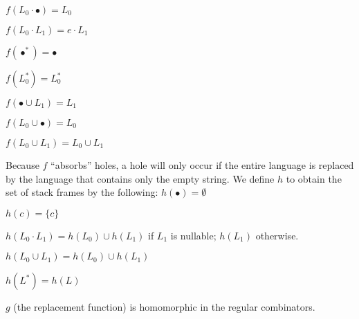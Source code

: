 \documentclass{sigplanconf}
\begin{document}
$f(L_0\cdot\bullet)=L_0$

$f(L_0\cdot L_1)=e\cdot L_1$

$f(\bullet^*)=\bullet$

$f(L_0^*)=L_0^*$

$f(\bullet\cup L_1)=L_1$

$f(L_0\cup\bullet)=L_0$

$f(L_0\cup L_1)=L_0\cup L_1$

Because $f$ ``absorbs'' holes, a hole will only occur if the entire language is replaced by the language that contains only the empty string.
We define $h$ to obtain the set of stack frames by the following:
$h(\bullet)=\emptyset$

$h(c)=\{c\}$

$h(L_0\cdot L_1)=h(L_0)\cup h(L_1)$ if $L_1$ is nullable; $h(L_1)$ otherwise.

$h(L_0\cup L_1)=h(L_0)\cup h(L_1)$

$h(L^*)=h(L)$

$g$ (the replacement function) is homomorphic in the regular combinators. 







\end{document}
